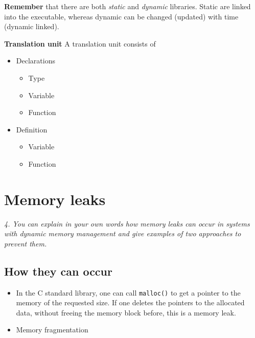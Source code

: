 \documentclass{article}
\begin{document}
\textbf{Remember} that there are both \emph{static} and \emph{dynamic} libraries. Static are linked into the executable, whereas dynamic can be changed (updated) with time (dynamic linked).

\textbf{Translation unit}
A translation unit consists of
\begin{itemize}
	\item Declarations
	\begin{itemize}
		\item Type
		\item Variable
		\item Function
	\end{itemize}

	\item Definition
	\begin{itemize}
		\item Variable
		\item Function
	\end{itemize}
\end{itemize}


\section{Memory leaks}
\emph{4. You can explain in your own words how memory leaks can occur in systems with dynamic memory management and give examples of two approaches to prevent them.}

\subsection{How they can occur}
\begin{itemize}
	\item In the C standard library, one can call \texttt{malloc()} to get a pointer to the memory of the requested size.
 If one deletes the pointers to the allocated data, without freeing the memory block before, this is a memory leak.

 	\item Memory fragmentation
\end{itemize}
\end{document}
